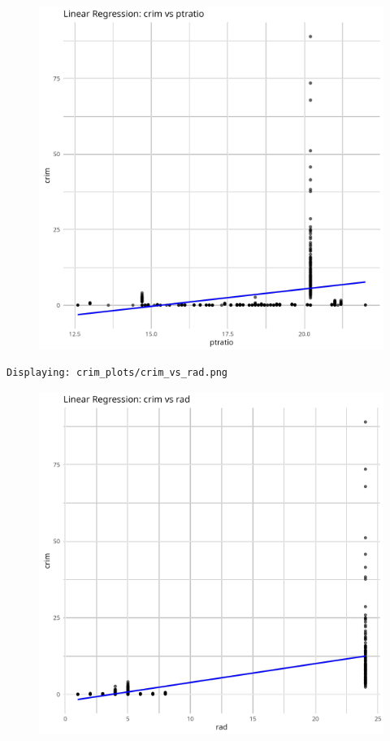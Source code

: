 \documentclass[
]{article}
\begin{document}
\begin{figure}[H]

{\centering \includegraphics{hw1_files/figure-pdf/unnamed-chunk-16-8.pdf}

}

\end{figure}

\begin{verbatim}
Displaying: crim_plots/crim_vs_rad.png 
\end{verbatim}

\begin{figure}[H]

{\centering \includegraphics{hw1_files/figure-pdf/unnamed-chunk-16-9.pdf}

}

\end{figure}
\end{document}
